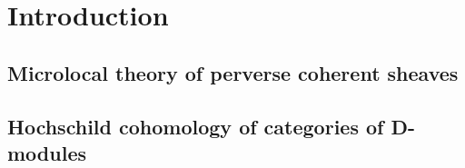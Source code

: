 \chapter{Introduction}

\section{Microlocal theory of perverse coherent sheaves}

\section{Hochschild cohomology of categories of D-modules}
